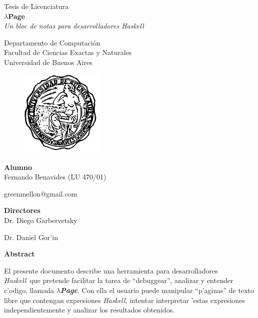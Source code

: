 \documentclass[a4paper]{article}
\newcommand{\haskell}{\textsl{Haskell}}
\newcommand{\hpage}{\textbf{\textsl{$\lambda$Page}}}
\begin{document}
    \thispagestyle{empty}
    \begin{center}
	    {\Large Tesis de Licenciatura}\\[1em]
	    {\huge \textbf{$\lambda$Page}}\\[0.5em]
	    {\large \textit{Un bloc de notas para desarrolladores Haskell}}\\[1em]
	    \par{}
	    {\large Departamento de Computaci\'on}\\[0.5em]
	    {\large Facultad de Ciencias Exactas y Naturales}\\[0.5em]
	    {\large Universidad de Buenos Aires}
	    \par{}
	    \begin{figure}[h]
	        \begin{center}
	        \includegraphics[width=40mm]{pictures/logoUba}
	        \end{center}
	    \end{figure}
	    {\Large \textbf{Alumno}}\\[0.8em]
	    {\Large Fernando Benavides (LU 470/01)} \par
	    {\Large greenmellon@gmail.com} \par
	    \par{}
	    {\Large \textbf{Directores}}\\[0.8em]
	    {\Large Dr. Diego Garbervetsky} \par
	    {\Large Dr. Daniel Gor'in} \par
	    \par{}
         {\Large \textbf{Abstract}}\\[0.5em]
    \end{center}
    El presente documento describe una herramienta para desarrolladores \haskell\ que pretende facilitar la tarea de ``debuggear'', analizar y entender c'odigo, llamada \hpage.  Con ella el usuario puede manipular ``p'aginas'' de texto libre que contengan expresiones \haskell, intentar interpretar 'estas expresiones independientemente y analizar los resultados obtenidos.
    \newpage
\end{document}
